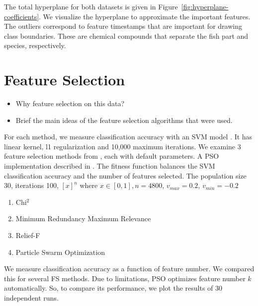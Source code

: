 \documentclass[runningheads]{llncs}
\begin{document}
The total hyperplane for both datasets is given in Figure~\ref{fig:hyperplane-coefficients}.
We visualize the hyperplane to approximate the important features. 
The outliers correspond to feature timestamps that are important for drawing class boundaries. 
These are chemical compounds that separate the fish part and species, respectively. 

\section{Feature Selection}


\begin{itemize}
  \item Why feature selection on this data? 
  \item Brief the main ideas of the feature selection algorithms that were used. 
\end{itemize}

For each method, we measure classification accuracy with an SVM model \cite{sklearn2021feature}.
It has linear kernel, l1 regularization \cite{robnik2003theoretical} and 10,000 maximum iterations.
We examine 3 feature selection methods from \cite{li2018feature}, each with default parameters.
A PSO implementation described in \cite{kennedy1995particle}.
The fitness function balances the SVM classification accuracy and the number of features selected.
The population size 30, iterations 100, $[x]^n$ where $x \in [0,1], n = 4800$, $v_{max} = 0.2$, ${v_{min} = -0.2}$

\begin{enumerate}
  \item Chi$^2$ \cite{liu1995chi2}
  \item Minimum Redundancy Maximum Relevance \cite{ding2005minimum}
  \item Relief-F \cite{robnik2003theoretical}
  \item Particle Swarm Optimization \cite{kennedy1995particle}
\end{enumerate}

We measure classification accuracy as a function of feature number.
We compared this for several FS methods.
Due to limitations, PSO optimizes feature number $k$ automatically.
So, to compare its performance, we plot the results of 30 independent runs.
\\\\
\end{document}
